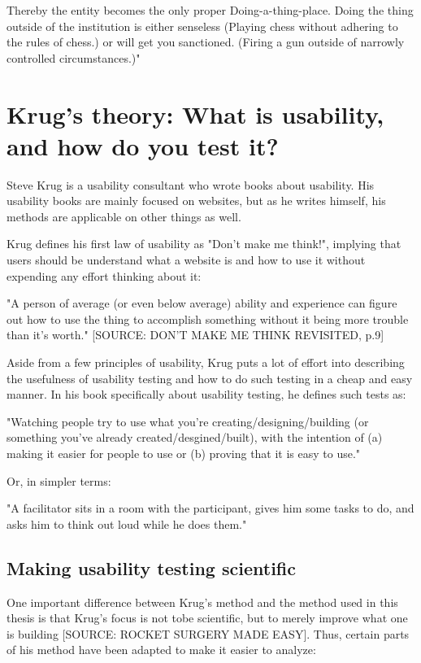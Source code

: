 Thereby the entity becomes the only proper Doing-a-thing-place. Doing the thing outside of the institution is either senseless (Playing chess without adhering to the rules of chess.) or will get you sanctioned. (Firing a gun outside of narrowly controlled circumstances.)"

\section{Krug's theory: What is usability, and how do you test it?}

Steve Krug is a usability consultant who wrote books about usability. His usability books are mainly focused on websites, but as he writes himself, his methods are applicable on other things as well.

Krug defines his first law of usability as "Don't make me think!", implying that users should be understand what a website is and how to use it without expending any effort thinking about it:

"A person of average (or even below average) ability and experience can figure out how to use the thing to accomplish something without it being more trouble than it's worth." [SOURCE: DON'T MAKE ME THINK REVISITED, p.9]

Aside from a few principles of usability, Krug puts a lot of effort into describing the usefulness of usability testing and how to do such testing in a cheap and easy manner. In his book specifically about usability testing, he defines such tests as:

"Watching people try to use what you're creating/designing/building (or something you've already created/desgined/built), with the intention of (a) making it easier for people to use or (b) proving that it is easy to use."

Or, in simpler terms:

"A facilitator sits in a room with the participant, gives him some tasks to do, and asks him to think out loud while he does them."

\subsection{Making usability testing scientific}

One important difference between Krug's method and the method used in this thesis is that Krug's focus is not tobe scientific, but to merely improve what one is building [SOURCE: ROCKET SURGERY MADE EASY]. Thus, certain parts of his method have been adapted to make it easier to analyze:


